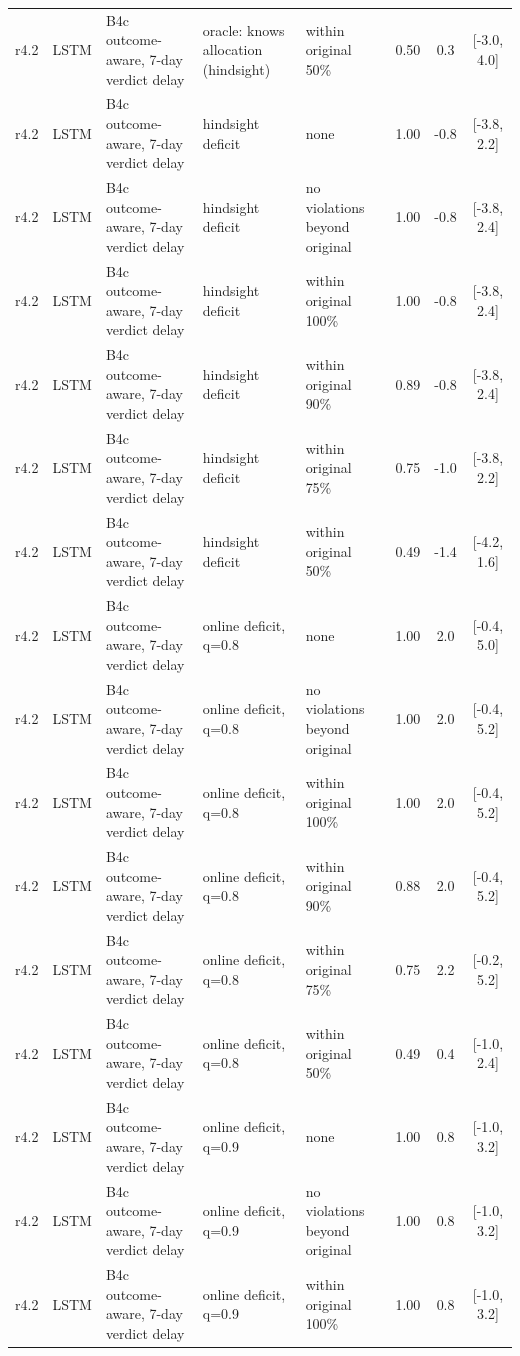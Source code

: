 \documentclass[10pt,onecolumn,letterpaper]{article}
\begin{document}
\begin{longtable}{lllp{4.2cm}p{3.4cm}ccc}
r4.2 & LSTM & B4c outcome-aware, 7-day verdict delay & oracle: knows allocation (hindsight) & within original 50\% & 0.50 & 0.3 & [-3.0, 4.0] \\
r4.2 & LSTM & B4c outcome-aware, 7-day verdict delay & hindsight deficit & none & 1.00 & -0.8 & [-3.8, 2.2] \\
r4.2 & LSTM & B4c outcome-aware, 7-day verdict delay & hindsight deficit & no violations beyond original & 1.00 & -0.8 & [-3.8, 2.4] \\
r4.2 & LSTM & B4c outcome-aware, 7-day verdict delay & hindsight deficit & within original 100\% & 1.00 & -0.8 & [-3.8, 2.4] \\
r4.2 & LSTM & B4c outcome-aware, 7-day verdict delay & hindsight deficit & within original 90\% & 0.89 & -0.8 & [-3.8, 2.4] \\
r4.2 & LSTM & B4c outcome-aware, 7-day verdict delay & hindsight deficit & within original 75\% & 0.75 & -1.0 & [-3.8, 2.2] \\
r4.2 & LSTM & B4c outcome-aware, 7-day verdict delay & hindsight deficit & within original 50\% & 0.49 & -1.4 & [-4.2, 1.6] \\
r4.2 & LSTM & B4c outcome-aware, 7-day verdict delay & online deficit, q=0.8 & none & 1.00 & 2.0 & [-0.4, 5.0] \\
r4.2 & LSTM & B4c outcome-aware, 7-day verdict delay & online deficit, q=0.8 & no violations beyond original & 1.00 & 2.0 & [-0.4, 5.2] \\
r4.2 & LSTM & B4c outcome-aware, 7-day verdict delay & online deficit, q=0.8 & within original 100\% & 1.00 & 2.0 & [-0.4, 5.2] \\
r4.2 & LSTM & B4c outcome-aware, 7-day verdict delay & online deficit, q=0.8 & within original 90\% & 0.88 & 2.0 & [-0.4, 5.2] \\
r4.2 & LSTM & B4c outcome-aware, 7-day verdict delay & online deficit, q=0.8 & within original 75\% & 0.75 & 2.2 & [-0.2, 5.2] \\
r4.2 & LSTM & B4c outcome-aware, 7-day verdict delay & online deficit, q=0.8 & within original 50\% & 0.49 & 0.4 & [-1.0, 2.4] \\
r4.2 & LSTM & B4c outcome-aware, 7-day verdict delay & online deficit, q=0.9 & none & 1.00 & 0.8 & [-1.0, 3.2] \\
r4.2 & LSTM & B4c outcome-aware, 7-day verdict delay & online deficit, q=0.9 & no violations beyond original & 1.00 & 0.8 & [-1.0, 3.2] \\
r4.2 & LSTM & B4c outcome-aware, 7-day verdict delay & online deficit, q=0.9 & within original 100\% & 1.00 & 0.8 & [-1.0, 3.2] \\

\end{longtable}
\end{document}
